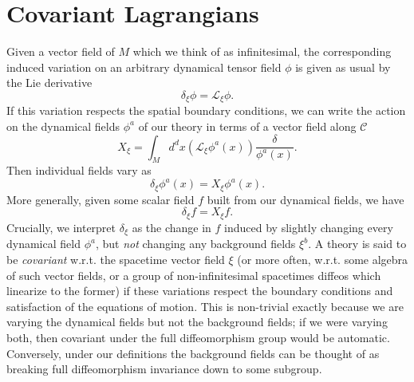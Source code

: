 \documentclass[11pt,letterpaper]{article}
\newcommand{\LP}{\left(}
\newcommand{\RP}{\right)}
\newcommand{\mc}[1]{\mathcal{#1}}
\begin{document}
\section{Covariant Lagrangians}
Given a vector field of $M$ which we think of as infinitesimal, the corresponding induced variation on an arbitrary dynamical tensor field $\phi$ is given as usual by the Lie derivative \begin{equation}
\delta_\xi \phi = \mc{L}_\xi \phi.
\end{equation}
If this variation respects the spatial boundary conditions, we can write the action on the dynamical fields $\phi^a$ of our theory in terms of a vector field along $\mc{C}$ \begin{equation}
X_\xi = \int_M d^d x \LP \mc{L}_\xi \phi^a(x) \RP \frac{\delta}{\phi^a(x)}.
\end{equation}
Then individual fields vary as \begin{equation}
\delta_\xi \phi^a(x) = X_\xi \phi^a(x).
\end{equation}
More generally, given some scalar field $f$ built from our dynamical fields, we have \begin{equation}
\delta_\xi f = X_\xi f.
\end{equation}
Crucially, we interpret $\delta_\xi$ as the change in $f$ induced by slightly changing every dynamical field $\phi^a$, but \textit{not} changing any background fields $\xi^b$. A theory is said to be \textit{covariant} w.r.t. the spacetime vector field $\xi$ (or more often, w.r.t. some algebra of such vector fields, or a group of non-infinitesimal spacetimes diffeos which linearize to the former) if these variations respect the boundary conditions and satisfaction of the equations of motion. This is non-trivial exactly because we are varying the dynamical fields but not the background fields; if we were varying both, then covariant under the full diffeomorphism group would be automatic. Conversely, under our definitions the background fields can be thought of as breaking full diffeomorphism invariance down to some subgroup.
\end{document}
